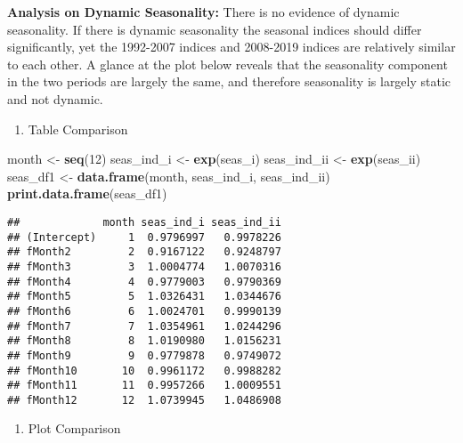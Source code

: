 \documentclass[
]{article}
\newenvironment{Shaded}{\begin{snugshade}}{\end{snugshade}}
\newcommand{\DecValTok}[1]{\textcolor[rgb]{0.00,0.00,0.81}{#1}}
\newcommand{\FunctionTok}[1]{\textcolor[rgb]{0.13,0.29,0.53}{\textbf{#1}}}
\newcommand{\NormalTok}[1]{#1}
\newcommand{\OtherTok}[1]{\textcolor[rgb]{0.56,0.35,0.01}{#1}}
\providecommand{\tightlist}{%
  \setlength{\itemsep}{0pt}\setlength{\parskip}{0pt}}
\begin{document}
\textbf{Analysis on Dynamic Seasonality: } There is no evidence of
dynamic seasonality. If there is dynamic seasonality the seasonal
indices should differ significantly, yet the 1992-2007 indices and
2008-2019 indices are relatively similar to each other. A glance at the
plot below reveals that the seasonality component in the two periods are
largely the same, and therefore seasonality is largely static and not
dynamic.

\begin{enumerate}
\def\labelenumi{(\roman{enumi})}
\tightlist
\item
  Table Comparison
\end{enumerate}

\begin{Shaded}
\begin{Highlighting}[]
\NormalTok{month }\OtherTok{\textless{}{-}} \FunctionTok{seq}\NormalTok{(}\DecValTok{12}\NormalTok{)}
\NormalTok{seas\_ind\_i }\OtherTok{\textless{}{-}} \FunctionTok{exp}\NormalTok{(seas\_i)}
\NormalTok{seas\_ind\_ii }\OtherTok{\textless{}{-}} \FunctionTok{exp}\NormalTok{(seas\_ii)}
\NormalTok{seas\_df1 }\OtherTok{\textless{}{-}} \FunctionTok{data.frame}\NormalTok{(month, seas\_ind\_i, seas\_ind\_ii)}
\FunctionTok{print.data.frame}\NormalTok{(seas\_df1)}
\end{Highlighting}
\end{Shaded}

\begin{verbatim}
##             month seas_ind_i seas_ind_ii
## (Intercept)     1  0.9796997   0.9978226
## fMonth2         2  0.9167122   0.9248797
## fMonth3         3  1.0004774   1.0070316
## fMonth4         4  0.9779003   0.9790369
## fMonth5         5  1.0326431   1.0344676
## fMonth6         6  1.0024701   0.9990139
## fMonth7         7  1.0354961   1.0244296
## fMonth8         8  1.0190980   1.0156231
## fMonth9         9  0.9779878   0.9749072
## fMonth10       10  0.9961172   0.9988282
## fMonth11       11  0.9957266   1.0009551
## fMonth12       12  1.0739945   1.0486908
\end{verbatim}

\begin{enumerate}
\def\labelenumi{(\roman{enumi})}
\setcounter{enumi}{1}
\tightlist
\item
  Plot Comparison
\end{enumerate}
\end{document}
